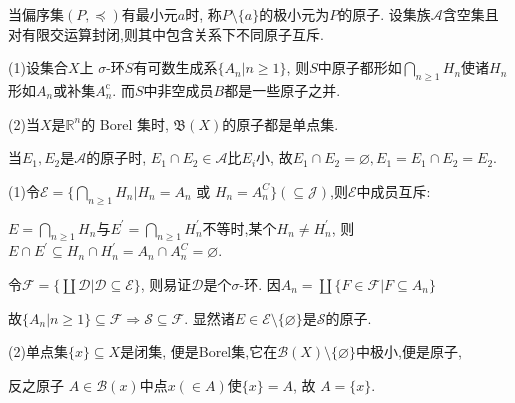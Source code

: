 \begin{5}
当偏序集$(P,\preceq)$有最小元$a$时, 称$P\setminus\{a\}$的极小元为$P$的原子. 
设集族$\mathcal{A}$含空集且对有限交运算封闭,则其中包含关系下不同原子互斥.

(1)设集合$X$上 $\sigma$-环$S$有可数生成系$\{A_n|n\geqslant1\}$,
则$S$中原子都形如$\bigcap\limits_{n\geqslant1}H_n$使诸$H_n$形如$A_n$或补集$A_n^\mathrm{c}$.
而$S$中非空成员$B$都是一些原子之并.

(2)当$X$是$\mathbb{R}^n$的 Borel 集时, $\mathfrak{B}(X)$的原子都是单点集.
 \end{5}  
\begin{solution}
当$E_{1},E_{2}$是$\mathcal{A}$的原子时, $E_1\cap E_2\in\mathcal{A} $比$E_i$小, 
故$E_{1}\cap E_{2}=\varnothing, E_1=E_{1}\cap E_{2}=E_{2}$.

(1)令$\mathcal{E}=\{\bigcap\limits_{n\geqslant1}H_{n}|H_{n}=A_{n}\text{ 或 }H_{n}=A_{n}^C\}(\subseteq \mathcal{J})$,则$\mathcal{E}$中成员互斥:

$E=\bigcap\limits_{n\geqslant1}H_n$与$E^{\prime}=\bigcap\limits_{n\geqslant1}H^{\prime}_n$不等时,某个$H_{n}\neq H_{n}^{\prime}$,
则$E\cap E^{\prime}\subseteq H_{n}\cap H_{n}^{\prime}=A_{n}\cap A_n^C=\varnothing$.

令$\mathcal{F}=\{\coprod \mathcal{D}|\mathcal{D}\subseteq\mathcal{E}\}$,
则易证$\mathcal{D}$是个$\sigma$-环.
因$A_{n}=\coprod\{F\in\mathcal{F}|F\subseteq A_{n}\}$

故$\{A_n|n\geqslant 1\}\subseteq\mathcal{F}\Rightarrow\mathcal{S}\subseteq\mathcal{F}$. 
显然诸$E\in \mathcal{E}\setminus\{\varnothing\}$是$\mathcal{S}$的原子.

(2)单点集$\{x\}\subseteq X$是闭集, 便是Borel集,它在$\mathcal{B}(X)\setminus\{\varnothing\}$中极小,便是原子,

反之原子 $A\in \mathcal{B}(x)$中点$x(\in A)$使$\{x\}=A$, 故 $A=\{x\}$.
\end{solution}

